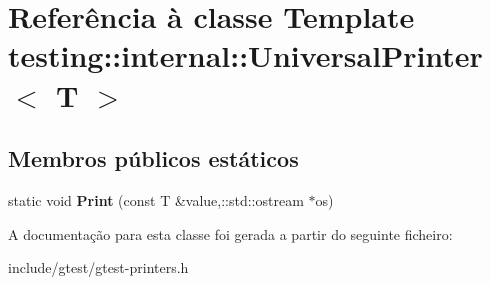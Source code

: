 \hypertarget{classtesting_1_1internal_1_1UniversalPrinter}{\section{Referência à classe Template testing\-:\-:internal\-:\-:Universal\-Printer$<$ T $>$}
\label{classtesting_1_1internal_1_1UniversalPrinter}
}
\subsection*{Membros públicos estáticos}
\begin{DoxyCompactItemize}
\item 
\hypertarget{classtesting_1_1internal_1_1UniversalPrinter_a6a7d29444412467c14931bc55a046138}{static void {\bfseries Print} (const T \&value,\-::std\-::ostream $\ast$os)}\label{classtesting_1_1internal_1_1UniversalPrinter_a6a7d29444412467c14931bc55a046138}

\end{DoxyCompactItemize}


A documentação para esta classe foi gerada a partir do seguinte ficheiro\-:\begin{DoxyCompactItemize}
\item 
include/gtest/gtest-\/printers.\-h\end{DoxyCompactItemize}
